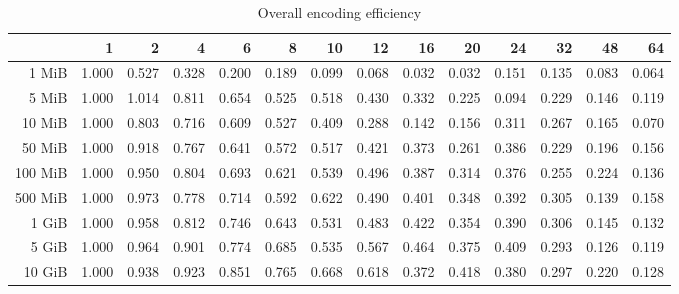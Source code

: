\begin{table}[!h]
	\centering
	\caption{Overall encoding efficiency}
	\begin{tabular}{rrrrrrrrrrrrrr}
		\toprule
		\diagbox[width=7em]{Size}{Threads} &    1  &    2  &    4  &    6  &    8  &    10 &    12 &    16 &    20 &    24 &    32 &    48 &    64 \\
		\midrule
		1 MiB   & 1.000 & 0.527 & 0.328 & 0.200 & 0.189 & 0.099 & 0.068 & 0.032 & 0.032 & 0.151 & 0.135 & 0.083 & 0.064 \\
		5 MiB   & 1.000 & 1.014 & 0.811 & 0.654 & 0.525 & 0.518 & 0.430 & 0.332 & 0.225 & 0.094 & 0.229 & 0.146 & 0.119 \\
		10 MiB  & 1.000 & 0.803 & 0.716 & 0.609 & 0.527 & 0.409 & 0.288 & 0.142 & 0.156 & 0.311 & 0.267 & 0.165 & 0.070 \\
		50 MiB  & 1.000 & 0.918 & 0.767 & 0.641 & 0.572 & 0.517 & 0.421 & 0.373 & 0.261 & 0.386 & 0.229 & 0.196 & 0.156 \\
		100 MiB & 1.000 & 0.950 & 0.804 & 0.693 & 0.621 & 0.539 & 0.496 & 0.387 & 0.314 & 0.376 & 0.255 & 0.224 & 0.136 \\
		500 MiB & 1.000 & 0.973 & 0.778 & 0.714 & 0.592 & 0.622 & 0.490 & 0.401 & 0.348 & 0.392 & 0.305 & 0.139 & 0.158 \\
		1 GiB   & 1.000 & 0.958 & 0.812 & 0.746 & 0.643 & 0.531 & 0.483 & 0.422 & 0.354 & 0.390 & 0.306 & 0.145 & 0.132 \\
		5 GiB   & 1.000 & 0.964 & 0.901 & 0.774 & 0.685 & 0.535 & 0.567 & 0.464 & 0.375 & 0.409 & 0.293 & 0.126 & 0.119 \\
		10 GiB  & 1.000 & 0.938 & 0.923 & 0.851 & 0.765 & 0.668 & 0.618 & 0.372 & 0.418 & 0.380 & 0.297 & 0.220 & 0.128 \\
		\bottomrule
	\end{tabular}
\end{table}
